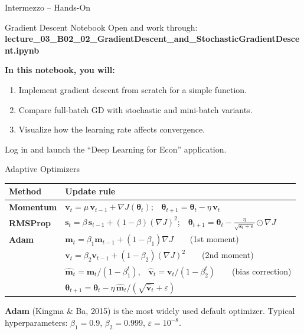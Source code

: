 \documentclass[aspectratio=169,11pt]{beamer}
\begin{document}
\begin{frame}{Intermezzo -- Hands-On}
\begin{block}{Gradient Descent Notebook}
Open and work through: \textbf{lecture\_03\_B02\_02\_GradientDescent\_and\_StochasticGradientDescent.ipynb}
\end{block}

\vspace{0.5cm}
\textbf{In this notebook, you will:}
\begin{enumerate}
    \item Implement gradient descent from scratch for a simple function.
    \item Compare full-batch GD with stochastic and mini-batch variants.
    \item Visualize how the learning rate affects convergence.
\end{enumerate}

\vspace{0.5cm}
\begin{center}
{\small Log in and launch the ``Deep Learning for Econ'' application.}
\end{center}
\end{frame}

\begin{frame}{Adaptive Optimizers}
\begin{small}
\renewcommand{\arraystretch}{1.5}
\begin{tabular}{lp{9cm}}
\toprule
\textbf{Method} & \textbf{Update rule} \\
\midrule
\textbf{Momentum} & $\bm{v}_t = \mu\,\bm{v}_{t-1} + \nabla J(\bm{\theta}_t)$;~~$\bm{\theta}_{t+1} = \bm{\theta}_t - \eta\,\bm{v}_t$ \\[2pt]
\textbf{RMSProp} & $\bm{s}_t = \beta\,\bm{s}_{t-1} + (1-\beta)(\nabla J)^2$;~~$\bm{\theta}_{t+1} = \bm{\theta}_t - \frac{\eta}{\sqrt{\bm{s}_t + \varepsilon}}\odot\nabla J$ \\[2pt]
\textbf{Adam} & $\bm{m}_t = \beta_1\bm{m}_{t-1} + (1-\beta_1)\nabla J$~~~~(1st moment) \\
& $\bm{v}_t = \beta_2\bm{v}_{t-1} + (1-\beta_2)(\nabla J)^2$~~~~(2nd moment) \\
& $\hat{\bm{m}}_t = \bm{m}_t/(1-\beta_1^t)$,~~$\hat{\bm{v}}_t = \bm{v}_t/(1-\beta_2^t)$~~~~(bias correction) \\
& $\bm{\theta}_{t+1} = \bm{\theta}_t - \eta\,\hat{\bm{m}}_t \big/ (\sqrt{\hat{\bm{v}}_t} + \varepsilon)$ \\
\bottomrule
\end{tabular}
\end{small}

\vspace{0.4cm}
{\small \textbf{Adam} (Kingma \& Ba, 2015) is the most widely used default optimizer.  Typical hyperparameters: $\beta_1=0.9$, $\beta_2=0.999$, $\varepsilon=10^{-8}$.}
\end{frame}
\end{document}
